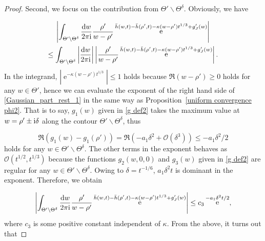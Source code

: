 \documentclass[cmp]{svjour}
\numberwithin{theorem}{section}
\numberwithin{equation}{section}
\DeclareMathOperator{\e}{e}
\def\dd{{\rm d}}
\def\ii{{\rm i}}
\begin{document}
\begin{proof}
Second, we focus on the contribution from $\Theta' \backslash \Theta^\delta$.
Obviously, we have


\begin{multline}
\label{Gaussian_part_rest_1}
\left| \int_{\Theta' \backslash \Theta^\delta} \frac{\dd w}{2 \pi \ii} \frac{\rho'}{w - \rho'}  \e^{\bar{h}(w,t)-\bar{h}(\rho',t) - \kappa (w - \rho') t^{1/3} + g'_J(w)} \right| \\ \leq \int_{\Theta' \backslash \Theta^\delta} \left| \frac{\dd w}{2 \pi \ii} \right| \left|  \frac{\rho'}{w - \rho'}  \e^{\bar{h}(w,t)-\bar{h}(\rho',t) - \kappa (w - \rho') t^{1/3} + g'_J(w)} \right|.
\end{multline}
In the integrand, $|\e^{- \kappa (w - \rho') t^{1/3}}| \leq 1$ holds because $\Re(w - \rho') \geq 0$ holds for any $w \in \Theta'$, hence we can evaluate the exponent of the right hand side of \eqref{Gaussian_part_rest_1} in the same way as Proposition~\ref{uniform convergence phi2}. 
That is to say, $g_1(w)$ given in \eqref{g def2} takes the maximum value at $w = \rho' \pm \ii \delta$ along the contour $\Theta' \backslash \Theta^\delta$, thus 

\begin{equation*}
\Re(g_1(w) - g_1(\rho')) = \Re(- a_1 \delta^2 + \mathcal{O}( \delta^3)) \leq - a_1 \delta^2 / 2
\end{equation*}
holds for any $w \in \Theta' \backslash \Theta^\delta$.
The other terms in the exponent behaves as $\mathcal{O}(t^{1/2}, t^{1/3})$ because the functions $g_2(w,0,0)$ and $g_3(w)$ given in \eqref{g def2} are regular for any $w \in \Theta' \backslash \Theta^\delta$.
Owing to $\delta = t^{-1/6}$, $a_1 \delta^2 t$ is dominant in the exponent.
Therefore, we obtain

\begin{equation*}
\label{Gaussian_part_rest_2}
\begin{split}
\left| \int_{\Theta' \backslash \Theta^\delta} \frac{\dd w}{2 \pi \ii} \frac{\rho'}{w - \rho'}  \e^{\bar{h}(w,t)-\bar{h}(\rho',t) - \kappa (w - \rho') t^{1/3} + g'_J(w)} \right| \leq c_3 \e^{ - a_1 \delta^2 t / 2 } ,
\end{split}
\end{equation*}
where $c_3$ is some positive constant independent of $\kappa$.
From the above, it turns out that


\end{proof}
\end{document}
